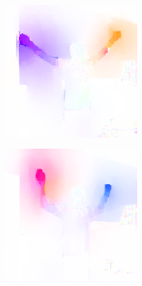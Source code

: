 \begin{figure}[!ht]
\begin{subfigure}[b]{0.24\textwidth}
        \caption{}
        \label{fig:optical-flow-b}
    \end{subfigure}
    \begin{subfigure}[b]{0.24\textwidth}
        \includegraphics[width=\linewidth]{figures/optical_flow/image000001127.png}
        \caption{}
        \label{fig:optical-flow-c}
    \end{subfigure}
    \begin{subfigure}[b]{0.24\textwidth}
        \includegraphics[width=\linewidth]{figures/optical_flow/image000001664.png}

\end{subfigure}
\end{figure}
